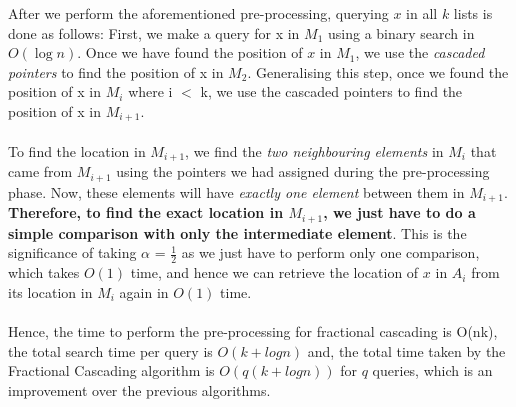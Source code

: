 \documentclass[11pt]{article}
\begin{document}
After we perform the aforementioned pre-processing, querying $x$ in all $k$ lists is done as follows:
First, we make a query for x in $M_1$ using a binary search in $O(\log n)$. Once we have found the position of $x$ in $M_1$, we use the \textit{cascaded pointers} to find the position of x in $M_2$. Generalising this step, once we found the position of x in $M_i$ where i $<$ k, we use the cascaded pointers to find the position of x in $M_{i+1}$. \\ \\
To find the location in $M_{i+1}$, we find the \textit{two neighbouring elements} in $M_{i}$ that came from $M_{i+1}$ using the pointers we had assigned during the pre-processing phase. Now, these elements will have \textit{exactly one element} between them in $M_{i+1}$. \textbf{Therefore, to find the exact location in $M_{i+1}$, we just have to do a simple comparison with only the intermediate element}. This is the significance of taking $\alpha$ = $\frac{1}{2}$ as we just have to perform only one comparison, which takes $O(1)$ time, and hence we can retrieve the location of $x$ in $A_i$ from its location in $M_i$ again in $O(1)$ time. \\ \\

Hence, the time to perform the pre-processing for fractional cascading is O(nk), the total search time per query is $O(k+log n)$ and, the total time taken by the Fractional Cascading algorithm is $O(q(k+logn))$ for $q$ queries, which is an improvement over the previous algorithms.



\end{document}
